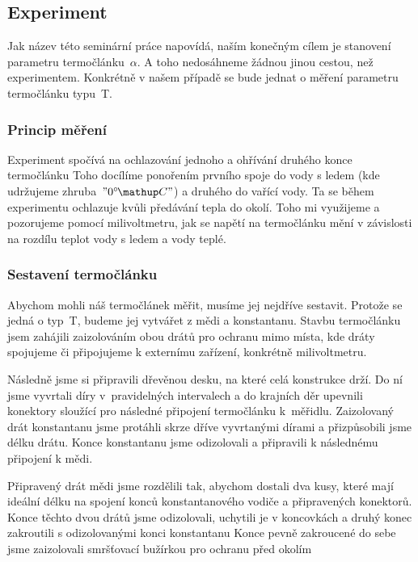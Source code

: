 \subsection{Experiment}
Jak název této seminární práce napovídá, naším konečným cílem je stanovení
parametru termočlánku~$\alpha$. A toho nedosáhneme žádnou jinou cestou, než
experimentem. Konkrétně v našem případě se bude jednat o měření parametru
termočlánku typu~T.

\subsubsection{Princip měření}
Experiment spočívá na ochlazování jednoho a ohřívání druhého konce termočlánku%
 Toho docílíme ponořením prvního
spoje do vody s ledem (kde udržujeme zhruba~$"0\C"$) a druhého do vařící vody.
Ta se během experimentu ochlazuje kvůli předávání tepla do okolí. Toho mi
využijeme a pozorujeme pomocí milivoltmetru, jak se napětí na termočlánku
mění v závislosti na rozdílu teplot vody s ledem a vody teplé.

\subsubsection{Sestavení termočlánku}
Abychom mohli náš termočlánek měřit, musíme jej nejdříve sestavit. Protože se
jedná o typ~T, budeme jej vytvářet z mědi a konstantanu. Stavbu termočlánku
jsem zahájili zaizolováním obou drátů pro ochranu mimo místa, kde dráty spojujeme
či připojujeme k externímu zařízení, konkrétně milivoltmetru.

Následně jsme si připravili dřevěnou desku, na které celá konstrukce drží.
Do ní jsme vyvrtali díry v~pravidelných intervalech a do krajních děr upevnili
konektory sloužící pro následné připojení termočlánku k~měřidlu. Zaizolovaný
drát konstantanu jsme protáhli skrze dříve vyvrtanými dírami a přizpůsobili
jsme délku drátu. Konce konstantanu jsme odizolovali a připravili k následnému
připojení k mědi.

Připravený drát mědi jsme rozdělili tak, abychom dostali dva kusy, které mají
ideální délku na spojení konců konstantanového vodiče a připravených konektorů.
Konce těchto dvou drátů jsme odizolovali, uchytili je v koncovkách a druhý
konec zakroutili s odizolovanými konci konstantanu%
Konce pevně zakroucené do sebe jsme zaizolovali smršťovací bužírkou pro ochranu
před okolím

